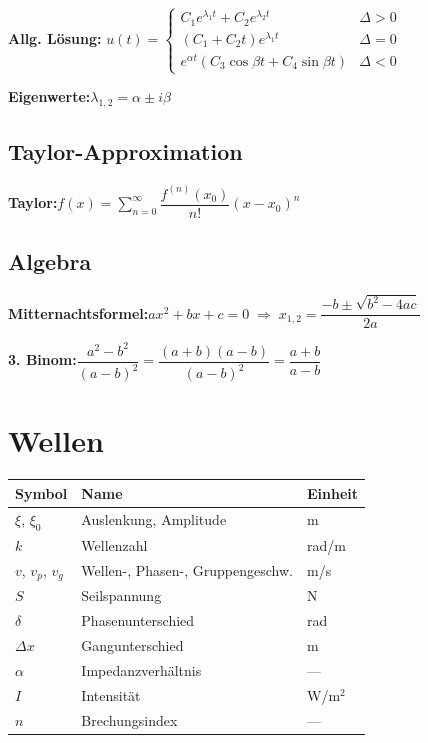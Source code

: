 \documentclass[10pt,a4paper]{article}
\newcommand{\fl}[2]{%
  \noindent #1\hfill$\displaystyle #2$\par\vspace{1pt}}
\begin{document}
\begin{multicols}{2}
\textbf{Allg. Lösung:}
$u(t)=\begin{cases}C_1 e^{\lambda_1 t}+C_2 e^{\lambda_2 t} & \Delta>0\\
(C_1+C_2 t)e^{\lambda_1 t} & \Delta=0\\
e^{\alpha t}(C_3\cos\beta t+C_4\sin\beta t) & \Delta<0\end{cases}$

\fl{\textbf{Eigenwerte:}}{\lambda_{1,2}=\alpha\pm i\beta}

\subsection{Taylor-Approximation}

\fl{\textbf{Taylor:}}{f(x)=\sum_{n=0}^{\infty}\dfrac{f^{(n)}(x_0)}{n!}(x-x_0)^n}

\subsection{Algebra}

\fl{\textbf{Mitternachtsformel:}}{ax^2+bx+c=0 \;\Rightarrow\; x_{1,2}=\dfrac{-b\pm\sqrt{b^2-4ac}}{2a}}
\fl{\textbf{3. Binom:}}{\dfrac{a^2-b^2}{(a-b)^2}=\dfrac{(a+b)(a-b)}{(a-b)^2}=\dfrac{a+b}{a-b}}

\section{Wellen}

\renewcommand{\arraystretch}{1.1}
\begin{tabularx}{\linewidth}{|l|X|l|}
\hline
\textbf{Symbol} & \textbf{Name} & \textbf{Einheit} \\
\hline
$\xi$, $\xi_0$ & Auslenkung, Amplitude & m \\
$k$            & Wellenzahl            & rad/m \\
$v$, $v_p$, $v_g$ & Wellen-, Phasen-, Gruppengeschw. & m/s \\
$S$            & Seilspannung          & N \\
$\delta$       & Phasenunterschied     & rad \\
$\Delta x$     & Gangunterschied       & m \\
$\alpha$       & Impedanzverhältnis    & --- \\
$I$            & Intensität            & W/m$^2$ \\
$n$            & Brechungsindex        & --- \\
\hline
\end{tabularx}


\end{multicols}
\end{document}
